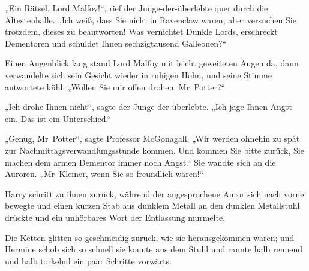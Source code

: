 „Ein Rätsel, Lord Malfoy!“, rief der Junge-der-überlebte quer durch die Ältestenhalle.
„Ich weiß, dass Sie nicht in Ravenclaw waren, aber versuchen Sie trotzdem, dieses zu beantworten! Was vernichtet Dunkle Lords, erschreckt Dementoren und schuldet Ihnen sechzigtausend Galleonen?“

Einen Augenblick lang stand Lord Malfoy mit leicht geweiteten Augen da, dann verwandelte sich sein Gesicht wieder in ruhigen Hohn, und seine Stimme antwortete kühl.
„Wollen Sie mir offen drohen, Mr~Potter?“

„Ich drohe Ihnen nicht“, sagte der Junge-der-überlebte.
„Ich jage Ihnen Angst ein. Das ist ein Unterschied.“

„Genug, Mr~Potter“, sagte Professor McGonagall.
„Wir werden ohnehin zu spät zur Nachmittagsverwandlungsstunde kommen. Und kommen Sie bitte zurück, Sie machen dem armen Dementor immer noch Angst.“
Sie wandte sich an die Auroren.
„Mr~Kleiner, wenn Sie so freundlich wären!“

Harry schritt zu ihnen zurück, während der angesprochene Auror sich nach vorne bewegte und einen kurzen Stab aus dunklem Metall an den dunklen Metallstuhl drückte und ein unhörbares Wort der Entlassung murmelte.

Die Ketten glitten so geschmeidig zurück, wie sie herausgekommen waren; und Hermine schob sich so schnell sie konnte aus dem Stuhl und rannte halb rennend und halb torkelnd ein paar Schritte vorwärts.

